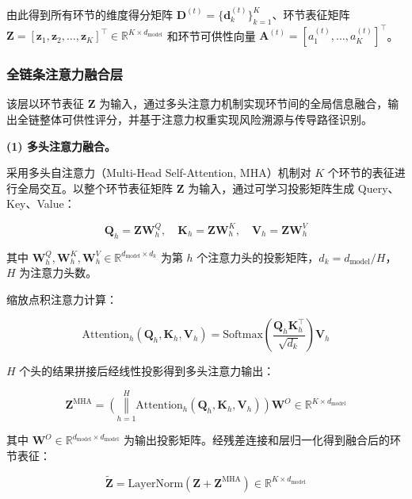 由此得到所有环节的维度得分矩阵 $\mathbf{D}^{(t)}=\{\mathbf{d}_k^{(t)}\}_{k=1}^{K}$、环节表征矩阵 $\mathbf{Z}=[\mathbf{z}_1,\mathbf{z}_2,\ldots,\mathbf{z}_K]^{\top}\in\mathbb{R}^{K\times d_{\text{model}}}$ 和环节可供性向量 $\mathbf{A}^{(t)}=[a_1^{(t)},\ldots,a_K^{(t)}]^{\top}$。

\subsubsection{全链条注意力融合层}

该层以环节表征 $\mathbf{Z}$ 为输入，通过多头注意力机制实现环节间的全局信息融合，输出全链整体可供性评分，并基于注意力权重实现风险溯源与传导路径识别。

\textbf{(1) 多头注意力融合。}

采用多头自注意力（Multi-Head Self-Attention, MHA）机制对 $K$ 个环节的表征进行全局交互。以整个环节表征矩阵 $\mathbf{Z}$ 为输入，通过可学习投影矩阵生成 Query、Key、Value：

\begin{equation}
\mathbf{Q}_h = \mathbf{Z}\mathbf{W}_h^Q, \quad \mathbf{K}_h = \mathbf{Z}\mathbf{W}_h^K, \quad \mathbf{V}_h = \mathbf{Z}\mathbf{W}_h^V
\end{equation}

其中 $\mathbf{W}_h^Q,\mathbf{W}_h^K,\mathbf{W}_h^V\in\mathbb{R}^{d_{\text{model}}\times d_k}$ 为第 $h$ 个注意力头的投影矩阵，$d_k = d_{\text{model}}/H$，$H$ 为注意力头数。

缩放点积注意力计算：

\begin{equation}
\text{Attention}_h(\mathbf{Q}_h,\mathbf{K}_h,\mathbf{V}_h) = \text{Softmax}\left(\frac{\mathbf{Q}_h\mathbf{K}_h^{\top}}{\sqrt{d_k}}\right)\mathbf{V}_h
\end{equation}

$H$ 个头的结果拼接后经线性投影得到多头注意力输出：

\begin{equation}
\mathbf{Z}^{\text{MHA}} = \left(\mathop{\Vert}\limits_{h=1}^{H} \text{Attention}_h(\mathbf{Q}_h,\mathbf{K}_h,\mathbf{V}_h)\right)\mathbf{W}^O \in \mathbb{R}^{K\times d_{\text{model}}}
\end{equation}

其中 $\mathbf{W}^O\in\mathbb{R}^{d_{\text{model}}\times d_{\text{model}}}$ 为输出投影矩阵。经残差连接和层归一化得到融合后的环节表征：

\begin{equation}
\tilde{\mathbf{Z}} = \text{LayerNorm}\left(\mathbf{Z} + \mathbf{Z}^{\text{MHA}}\right) \in \mathbb{R}^{K\times d_{\text{model}}}
\end{equation}


